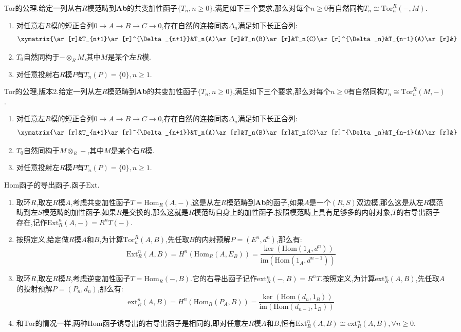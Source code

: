 Tor的公理.给定一列从右$R$模范畴到\textbf{Ab}的共变加性函子$\{T_n,n\ge0\}$,满足如下三个要求,那么对每个$n\ge0$有自然同构$T_n\cong\mathrm{Tor}_n^R(-,M)$.
\begin{enumerate}
	\item 对任意右$R$模的短正合列$0\to A\to B\to C\to0$,存在自然的连接同态$\Delta_n$满足如下长正合列:
	$$\xymatrix{\ar[r]&T_{n+1}\ar[r]^{\Delta_{n+1}}&T_n(A)\ar[r]&T_n(B)\ar[r]&T_n(C)\ar[r]^{\Delta_n}&T_{n-1}(A)\ar[r]&}$$
	\item $T_0$自然同构于$-\otimes_RM$,其中$M$是某个左$R$模.
	\item 对任意投射右$R$模$P$有$T_n(P)=\{0\},n\ge1$.
\end{enumerate}

Tor的公理,版本2.给定一列从左$R$模范畴到\textbf{Ab}的共变加性函子$\{T_n,n\ge0\}$,满足如下三个要求,那么对每个$n\ge0$有自然同构$T_n\cong\mathrm{Tor}_n^R(M,-)$.
\begin{enumerate}
	\item 对任意左$R$模的短正合列$0\to A\to B\to C\to0$,存在自然的连接同态$\Delta_n$满足如下长正合列:
	$$\xymatrix{\ar[r]&T_{n+1}\ar[r]^{\Delta_{n+1}}&T_n(A)\ar[r]&T_n(B)\ar[r]&T_n(C)\ar[r]^{\Delta_n}&T_{n-1}(A)\ar[r]&}$$
	\item $T_0$自然同构于$M\otimes_R-$,其中$M$是某个右$R$模.
	\item 对任意投射左$R$模$P$有$T_n(P)=\{0\},n\ge1$.
\end{enumerate}

Hom函子的导出函子.函子$\mathrm{Ext}$.
\begin{enumerate}
	\item 取环$R$,取左$R$模$A$,考虑共变加性函子$T=\mathrm{Hom}_R(A,-)$,这是从左$R$模范畴到\textbf{Ab}的函子,如果$A$是一个$(R,S)$双边模,那么这是从左$R$模范畴到左$S$模范畴的加性函子.如果$R$是交换的,那么这就是$R$模范畴自身上的加性函子.按照模范畴上具有足够多的内射对象,$T$的右导出函子存在,记作$\mathrm{Ext}^n_R(A,-)=R^nT(-)$.
	\item 按照定义,给定做$R$摸$A$和$B$,为计算$\mathrm{Tor}_n^R(A,B)$,先任取$B$的内射预解$P=(E^n,d^n)$,那么有:
	$$\mathrm{Ext}^n_R(A,B)=H^n(\mathrm{Hom}_R(A,E_B))=\frac{\ker(\mathrm{Hom}(1_A,d^n))}{\mathrm{im}(\mathrm{Hom}(1_A,d^{n-1}))}$$
	\item 取环$R$,取左$R$模$B$,考虑逆变加性函子$T=\mathrm{Hom}_R(-,B)$.它的右导出函子记作$\mathrm{ext}_R^n(-,B)=R^nT$.按照定义,为计算$\mathrm{ext}_R^n(A,B)$,先任取$A$的投射预解$P=(P_n,d_n)$,那么有:
	$$\mathrm{ext}_R^n(A,B)=H^n(\mathrm{Hom}_R(P_A,B))=\frac{\ker(\mathrm{Hom}(d_n,1_B))}{\mathrm{im}(\mathrm{Hom}(d_{n-1},1_B))}$$
	\item 和$\mathrm{Tor}$的情况一样,两种Hom函子诱导出的右导出函子是相同的,即对任意左$R$模$A$和$B$,恒有$\mathrm{Ext}_R^n(A,B)\cong\mathrm{ext}_R^n(A,B),\forall n\ge0$.
\end{enumerate}

